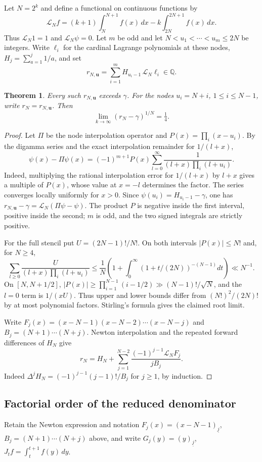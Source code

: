 \documentclass[11pt,a4paper,oneside,openany]{report}
\newtheorem{theorem}{Theorem}[section]
\theoremstyle{remark}\newtheorem{remark}[theorem]{Remark}
\numberwithin{equation}{section}
\begin{document}
Let $N=2^k$ and define a functional on continuous functions by
\[
 \mathcal L_N f=(k+1)\int_N^{N+1}f(x)\,dx-k\int_{2N}^{2N+1}f(x)\,dx.
\]
Thus $\mathcal L_N 1=1$ and $\mathcal L_N\psi=0$. Let $m$ be odd and let $N<u_1<\cdots<u_m\le2N$ be integers. Write $\ell_i$ for the cardinal Lagrange polynomials at these nodes, $H_j=\sum_{a=1}^j1/a$, and set
\[
 r_{N,\boldsymbol u}=\sum_{i=1}^m H_{u_i-1}\,\mathcal L_N\ell_i\in\mathbb Q.
\]
\begin{theorem}\label{ch6:th:signedpsi}
Every such $r_{N,\boldsymbol u}$ exceeds $\gamma$. For the nodes $u_i=N+i$, $1\le i\le N-1$, write $r_N=r_{N,\boldsymbol u}$. Then
\[
 \lim_{k\to\infty}(r_N-\gamma)^{1/N}=\tfrac14.
\]

\end{theorem}
\begin{proof}
Let $\Pi$ be the node interpolation operator and $P(x)=\prod_i(x-u_i)$. By the digamma series and the exact interpolation remainder for $1/(l+x)$,
\[
 \psi(x)-\Pi\psi(x)=(-1)^{m+1}P(x)\sum_{l=0}^\infty\frac1{(l+x)\prod_i(l+u_i)}.
\]
Indeed, multiplying the rational interpolation error for $1/(l+x)$ by $l+x$ gives a multiple of $P(x)$, whose value at $x=-l$ determines the factor. The series converges locally uniformly for $x>0$. Since $\psi(u_i)=H_{u_i-1}-\gamma$, one has $r_{N,\boldsymbol u}-\gamma=\mathcal L_N(\Pi\psi-\psi)$. The product $P$ is negative inside the first interval, positive inside the second; $m$ is odd, and the two signed integrals are strictly positive.

For the full stencil put $U=(2N-1)!/N!$. On both intervals $|P(x)|\le N!$ and, for $N\ge4$,
\[
 \sum_{l\ge0}\frac{U}{(l+x)\prod_i(l+u_i)}\le
 \frac1N\left(1+\int_0^\infty(1+t/(2N))^{-(N-1)}dt\right)\ll N^{-1}.
\]
On $[N,N+1/2]$, $|P(x)|\ge\prod_{i=1}^{N-1}(i-1/2)\gg (N-1)!/\sqrt N$, and the $l=0$ term is $1/(xU)$. Thus upper and lower bounds differ from $(N!)^2/(2N)!$ by at most polynomial factors. Stirling's formula gives the claimed root limit.

Write $F_j(x)=(x-N-1)(x-N-2)\cdots(x-N-j)$ and $B_j=(N+1)\cdots(N+j)$. Newton interpolation and the repeated forward differences of $H_N$ give
\[
 r_N=H_N+\sum_{j=1}^{N-2}\frac{(-1)^{j-1}\mathcal L_N F_j}{j B_j}.
\]
Indeed $\Delta^j H_N=(-1)^{j-1}(j-1)!/B_j$ for $j\ge1$, by induction. \end{proof}
\subsection{Factorial order of the reduced denominator}
Retain the Newton expression and notation $F_j(x)=(x-N-1)_{\underline j}$, $B_j=(N+1)\cdots(N+j)$ above, and write $G_j(y)=(y)_{\underline j}$, $J_t f=\int_t^{t+1}f(y)\,dy$.
\end{document}
